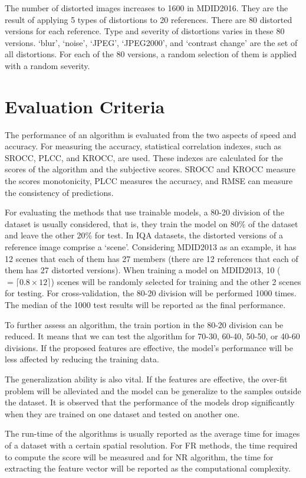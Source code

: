 The number of distorted images increases to 1600 in MDID2016. They are the result of applying 5 types of distortions to 20 references. There are 80 distorted versions for each reference. Type and severity of distortions varies in these 80 versions. `blur', `noise', `JPEG', `JPEG2000', and `contrast change' are the set of all distortions. For each of the 80 versions, a random selection of them is applied with a random severity.
\section{Evaluation Criteria}
The performance of an algorithm is evaluated from the two aspects of speed and accuracy. For measuring the accuracy, statistical correlation indexes, such as SROCC, PLCC, and KROCC, are used. These indexes are calculated for the scores of the algorithm and the subjective scores. SROCC and KROCC measure the scores monotonicity, PLCC measures the accuracy, and RMSE can measure the consistency of predictions.

For evaluating the methods that use trainable models, a 80-20 division of the dataset is usually considered, that is, they train the model on 80\% of the dataset and leave the other 20\% for test. In IQA datasets, the distorted versions of a reference image comprise a `scene'. Considering MDID2013 as an example, it has 12 scenes that each of them has 27 members (there are 12 references that each of them has 27 distorted versions). When training a model on MDID2013, 10 ($=\lceil0.8\times12\rceil$) scenes will be randomly selected for training and the other 2 scenes for testing. For cross-validation, the 80-20 division will be performed 1000 times. The median of the 1000 test results will be reported as the final performance. 

To further assess an algorithm, the train portion in the 80-20 division can be reduced. It means that we can test the algorithm for 70-30, 60-40, 50-50, or 40-60 divisions. If the proposed features are effective, the model's performance will be less affected by reducing the training data.

The generalization ability is also vital. If the features are effective, the over-fit problem will be alleviated and the model can be generalize to the samples outside the dataset. It is observed that the performance of the models drop significantly when they are trained on one dataset and tested on another one.

The run-time of the algorithms is usually reported as the average time for images of a dataset with a certain spatial resolution. For FR methods, the time required to compute the score will be measured and for NR algorithm, the time for extracting the feature vector will be reported as the computational complexity.

